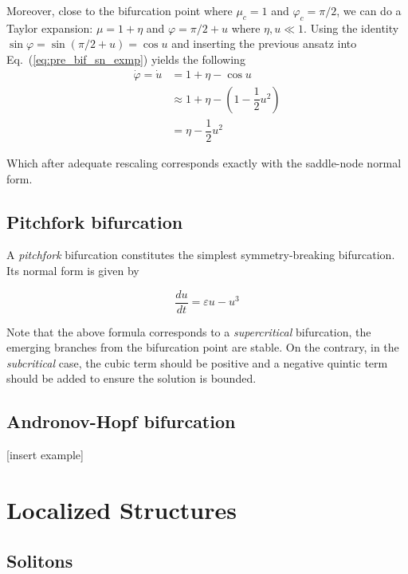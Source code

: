 \begin{exmp}
    Moreover, close to the bifurcation point where $\mu_c = 1$ and $\varphi_c = \pi/2$,
    we can do a Taylor expansion: $\mu = 1 + \eta$ and $\varphi = \pi/2 + u$ 
    where $\eta, u \ll 1$. Using the identity $\sin \varphi = \sin (\pi/2 + u) = \cos u$
    and inserting the previous ansatz into Eq.~(\ref{eq:pre_bif_sn_exmp}) yields
    the following
    \begin{align*}
        \dot{\varphi} = \dot{u} &= 1 + \eta - \cos u \\ 
        &\approx 1 + \eta - (1 - \dfrac12 u^2) \\
        &= \eta - \dfrac12 u^2
    \end{align*}

    Which after adequate rescaling corresponds exactly with the saddle-node
    normal form.
    

\end{exmp}

\subsection{Pitchfork bifurcation}

A {\em pitchfork} bifurcation constitutes the simplest symmetry-breaking bifurcation.
Its normal form is given by

\begin{equation}
    \dfrac{du}{dt} = \varepsilon u - u ^ 3
\end{equation}

Note that the above formula corresponds to a {\em supercritical} bifurcation, the emerging branches from the
bifurcation point are stable. On the contrary, in the {\em subcritical} case, the cubic
term should be positive and a negative quintic term should be added to ensure the solution is bounded.
\subsection{Andronov-Hopf bifurcation}

[insert example]

\section{Localized Structures}
\label{sec:fra_LS}

\subsection{Solitons}

